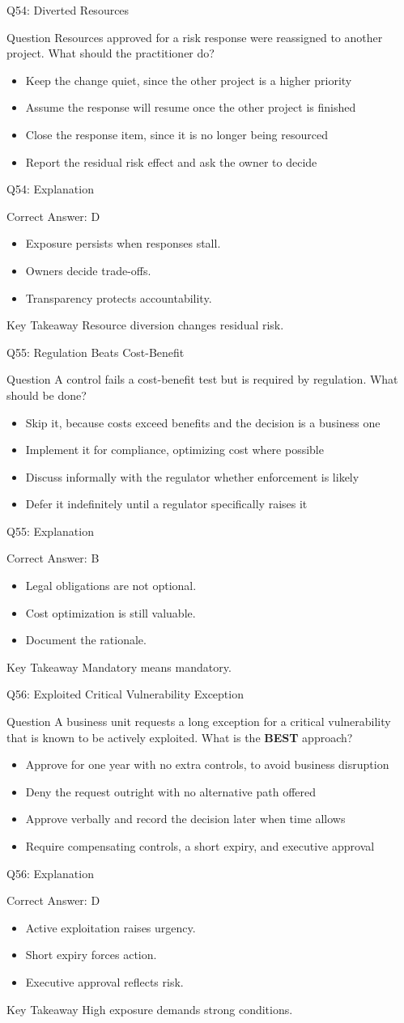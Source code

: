 \documentclass[aspectratio=169]{beamer}
\newcommand{\hq}[7]{%
	\begin{frame}{Q#1: #2}
		\begin{block}{Question}
			#3
		\end{block}
		\begin{itemize}
			#4
		\end{itemize}
	\end{frame}
	\begin{frame}{Q#1: Explanation}
		\begin{block}{Correct Answer: #5}
			\begin{itemize}
				#6
			\end{itemize}
		\end{block}
		\begin{alertblock}{Key Takeaway}
			#7
		\end{alertblock}
	\end{frame}
}
\begin{document}
	\hq{54}{Diverted Resources}
	{Resources approved for a risk response were reassigned to another project. What should the practitioner do?}
	{\item[\textbf{(A)}] Keep the change quiet, since the other project is a higher priority
		\item[\textbf{(B)}] Assume the response will resume once the other project is finished
		\item[\textbf{(C)}] Close the response item, since it is no longer being resourced
		\item[\textbf{(D)}] Report the residual risk effect and ask the owner to decide}
	{D}
	{\item Exposure persists when responses stall.
		\item Owners decide trade-offs.
		\item Transparency protects accountability.}
	{Resource diversion changes residual risk.}

	\hq{55}{Regulation Beats Cost-Benefit}
	{A control fails a cost-benefit test but is required by regulation. What should be done?}
	{\item[\textbf{(A)}] Skip it, because costs exceed benefits and the decision is a business one
		\item[\textbf{(B)}] Implement it for compliance, optimizing cost where possible
		\item[\textbf{(C)}] Discuss informally with the regulator whether enforcement is likely
		\item[\textbf{(D)}] Defer it indefinitely until a regulator specifically raises it}
	{B}
	{\item Legal obligations are not optional.
		\item Cost optimization is still valuable.
		\item Document the rationale.}
	{Mandatory means mandatory.}

	\hq{56}{Exploited Critical Vulnerability Exception}
	{A business unit requests a long exception for a critical vulnerability that is known to be actively exploited. What is the \textbf{BEST} approach?}
	{\item[\textbf{(A)}] Approve for one year with no extra controls, to avoid business disruption
		\item[\textbf{(B)}] Deny the request outright with no alternative path offered
		\item[\textbf{(C)}] Approve verbally and record the decision later when time allows
		\item[\textbf{(D)}] Require compensating controls, a short expiry, and executive approval}
	{D}
	{\item Active exploitation raises urgency.
		\item Short expiry forces action.
		\item Executive approval reflects risk.}
	{High exposure demands strong conditions.}
\end{document}

